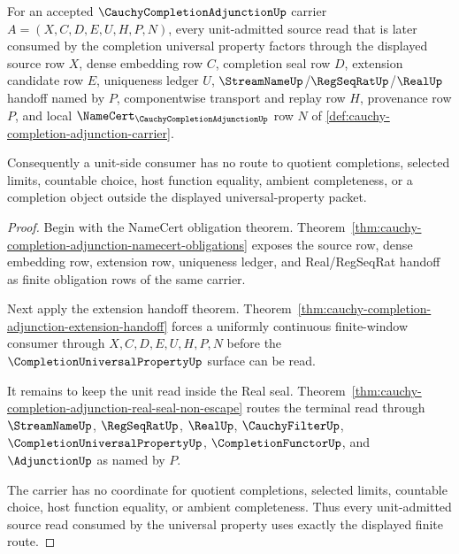 \begin{theorem}
\label{thm:cauchy-completion-adjunction-unit-universal-route}
For an accepted $\CauchyCompletionAdjunctionUp$ carrier $A=(X,C,D,E,U,H,P,N)$, every unit-admitted source read that is later consumed by the completion universal property factors through the displayed source row $X$, dense embedding row $C$, completion seal row $D$, extension candidate row $E$, uniqueness ledger $U$, $\StreamNameUp$/$\RegSeqRatUp$/$\RealUp$ handoff named by $P$, componentwise transport and replay row $H$, provenance row $P$, and local $\NameCert_{\CauchyCompletionAdjunctionUp}$ row $N$ of \autoref{def:cauchy-completion-adjunction-carrier}.

Consequently a unit-side consumer has no route to quotient completions, selected limits, countable choice, host function equality, ambient completeness, or a completion object outside the displayed universal-property packet.
\end{theorem}
\begin{proof}
Begin with the NameCert obligation theorem. Theorem~\ref{thm:cauchy-completion-adjunction-namecert-obligations} exposes the source row, dense embedding row, extension row, uniqueness ledger, and Real/RegSeqRat handoff as finite obligation rows of the same carrier.

Next apply the extension handoff theorem. Theorem~\ref{thm:cauchy-completion-adjunction-extension-handoff} forces a uniformly continuous finite-window consumer through $X,C,D,E,U,H,P,N$ before the $\CompletionUniversalPropertyUp$ surface can be read.

It remains to keep the unit read inside the Real seal. Theorem~\ref{thm:cauchy-completion-adjunction-real-seal-non-escape} routes the terminal read through $\StreamNameUp$, $\RegSeqRatUp$, $\RealUp$, $\CauchyFilterUp$, $\CompletionUniversalPropertyUp$, $\CompletionFunctorUp$, and $\AdjunctionUp$ as named by $P$.

The carrier has no coordinate for quotient completions, selected limits, countable choice, host function equality, or ambient completeness. Thus every unit-admitted source read consumed by the universal property uses exactly the displayed finite route.
\end{proof}


